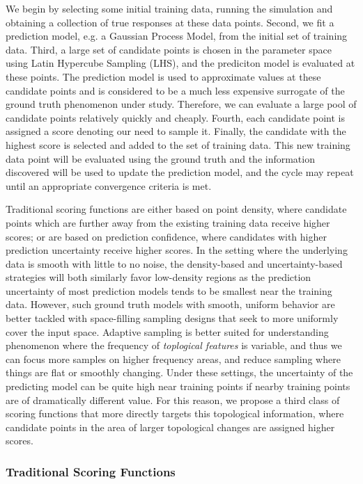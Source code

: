 We begin by selecting some initial training data, running the simulation and obtaining a collection of true responses at these data points.
%
Second, we fit a prediction model, e.g. a Gaussian Process Model, from the initial set of training data.
%
Third, a large set of candidate points is chosen in the parameter space using Latin Hypercube Sampling (LHS), and the prediciton model is evaluated at these points.
%
The prediction model is used to approximate values at these candidate points and is considered to be a much less expensive surrogate of the ground truth phenomenon under study.
%
Therefore, we can evaluate a large pool of candidate points relatively quickly and cheaply.
%
Fourth, each candidate point is assigned a score denoting our need to sample it.
%
Finally, the candidate with the highest score is selected and added to the set of training data.
%
This new training data point will be evaluated using the ground truth and the information discovered will be used to update the prediction model, and the cycle may repeat until an appropriate convergence criteria is met.

Traditional scoring functions are either based on point density, where candidate points which are further away from the existing training data receive higher scores; or are based on prediction confidence, where candidates with higher prediction uncertainty receive higher scores.
%
In the setting where the underlying data is smooth with little to no noise, the density-based and uncertainty-based strategies will both similarly favor low-density regions as the prediction uncertainty of most prediction models tends to be smallest near the training data.
%
However, such ground truth models with smooth, uniform behavior are better tackled with space-filling sampling designs that seek to more uniformly cover the input space.
%
Adaptive sampling is better suited for understanding phenomenon where the frequency of \emph{toplogical features} is variable, and thus we can focus more samples on higher frequency areas, and reduce sampling where things are flat or smoothly changing.
%
Under these settings, the uncertainty of the predicting model can be quite high near training points if nearby training points are of dramatically different value.
%
For this reason, we propose a third class of scoring functions that more directly targets this topological
information, where candidate points in the area of larger topological changes are assigned higher scores.

\subsubsection{Traditional Scoring Functions}
\label{sec:classic}

